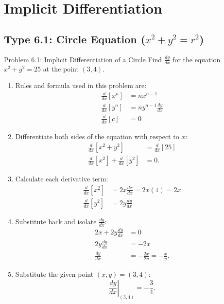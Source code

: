 \documentclass[11pt,a4paper]{article}
\begin{document}
\newpage
\section{Implicit Differentiation}

\subsection{Type 6.1: Circle Equation ($x^2 + y^2 = r^2$)}
\begin{problembox}{Problem 6.1: Implicit Differentiation of a Circle}
Find $\frac{dy}{dx}$ for the equation $x^2 + y^2 = 25$ at the point $(3, 4)$.
\end{problembox}
\begin{solutionbox}
\begin{enumerate}
	\item [Step 1.] Rules and formula used in this problem are:
	\begin{align*}
		\frac{d}{dx}[x^n] &= n x^{n-1} \\
		\frac{d}{dx}[y^n] &= n y^{n-1} \frac{dy}{dx} \\
		\frac{d}{dx}[c] &= 0
	\end{align*}
	
	\item [Step 2.] Differentiate both sides of the equation with respect to $x$:
	\begin{align*}\label{eq;6.1.1}
		\frac{d}{dx}\left[x^2 + y^2\right] &= \frac{d}{dx}[25] \\
		\frac{d}{dx}[x^2] + \frac{d}{dx}[y^2] &= 0.
	\end{align*}

	\item [Step 3.] Calculate each derivative term:
	\begin{align*}
		\frac{d}{dx}[x^2] &= 2x\frac{dx}{dx} = 2x(1) = 2x \\
		\frac{d}{dx}[y^2] &= 2y\frac{dy}{dx}
	\end{align*}

	\item [Step 4.] Substitute back and isolate $\frac{dy}{dx}$:
	\begin{align*}
		2x + 2y\frac{dy}{dx} &= 0 \\
		2y\frac{dy}{dx} &= -2x \\
		\frac{dy}{dx} &= -\frac{2x}{2y} = -\frac{x}{y}.
	\end{align*}

	\item [Step 5.] Substitute the given point $(x, y) = (3, 4)$:
	\begin{equation*}
		\left.\frac{dy}{dx}\right|_{(3, 4)} = -\frac{3}{4}.
	\end{equation*}
\end{enumerate}
\end{solutionbox}
\end{document}
